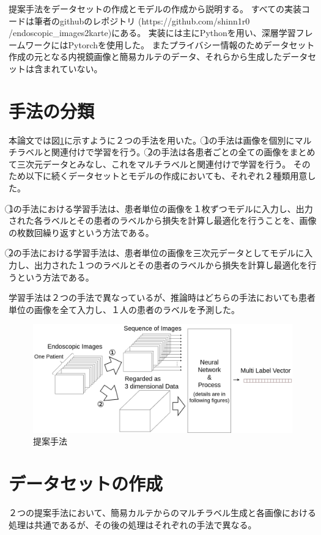 提案手法をデータセットの作成とモデルの作成から説明する。
すべての実装コードは筆者のgithubのレポジトリ (https://github.com/shinn1r0\\/endoscopic\_images2karte)にある。
実装には主にPythonを用い、深層学習フレームワークにはPytorchを使用した。
またプライバシー情報のためデータセット作成の元となる内視鏡画像と簡易カルテのデータ、それらから生成したデータセットは含まれていない。

\section{手法の分類}
本論文では図\ref{fig:methods}に示すように２つの手法を用いた。
\textcircled{\scriptsize 1}の手法は画像を個別にマルチラベルと関連付けで学習を行う。
\textcircled{\scriptsize 2}の手法は各患者ごとの全ての画像をまとめて三次元データとみなし、これをマルチラベルと関連付けで学習を行う。
そのため以下に続くデータセットとモデルの作成においても、それぞれ２種類用意した。

\textcircled{\scriptsize 1}の手法における学習手法は、患者単位の画像を１枚ずつモデルに入力し、出力された各ラベルとその患者のラベルから損失を計算し最適化を行うことを、画像の枚数回繰り返すという方法である。

\textcircled{\scriptsize 2}の手法における学習手法は、患者単位の画像を三次元データとしてモデルに入力し、出力された１つのラベルとその患者のラベルから損失を計算し最適化を行うという方法である。

学習手法は２つの手法で異なっているが、推論時はどちらの手法においても患者単位の画像を全て入力し、１人の患者のラベルを予測した。
\begin{figure}[htbp]
    \begin{center}
        \includegraphics[width=135mm]{./fig/ieice4.png}
        \caption{提案手法}
        \label{fig:methods}
    \end{center}
\end{figure}

\section{データセットの作成}
２つの提案手法において、簡易カルテからのマルチラベル生成と各画像における処理は共通であるが、その後の処理はそれぞれの手法で異なる。
